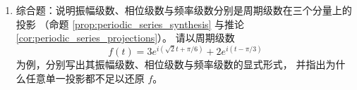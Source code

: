 \begin{enumerate}[leftmargin=3em, label=\textbf{题 \arabic*}]
    \item 综合题：说明振幅级数、相位级数与频率级数分别是周期级数在三个分量上的投影
    （命题 \ref{prop:periodic_series_synthesis} 与推论 \ref{cor:periodic_series_projections}）。
    请以周期级数
    \[
    f(t)=3e^{i(\sqrt{2}t+\pi/6)}+2e^{i(t-\pi/3)}
    \]
    为例，分别写出其振幅级数、相位级数与频率级数的显式形式，
    并指出为什么任意单一投影都不足以还原 $f$。
\end{enumerate}

